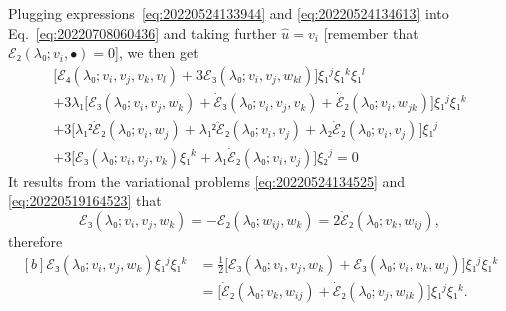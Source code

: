 \documentclass[12pt, final]{scrartcl}
\theoremstyle{definition}
\begin{document}
Plugging expressions~\eqref{eq:20220524133944} and \eqref{eq:20220524134613}
into Eq.~\eqref{eq:20220708060436} and taking further \(\hat{u} = v_i\)
[remember that \(ℰ₂(λ₀; v_i, •) = 0\)], we then get
\begin{multline*}
  \bigl[ℰ₄(λ₀; v_i, v_j, v_k, v_l) + 3ℰ₃(λ₀; v_i, v_j, w_{kl})\bigr] ξ₁^j ξ₁^k ξ₁^l\\
  + 3λ₁ \bigl[ℰ₃(λ₀; v_i, v_j, w_k) + \dot{ℰ}₃(λ₀; v_i, v_j, v_k) + \dot{ℰ}₂(λ₀; v_i, w_{jk}) \bigr] ξ₁^j ξ₁^k\\
  + 3\bigl[λ₁² \dot{ℰ}₂(λ₀; v_i, w_j) + λ₁² \ddot{ℰ}₂(λ₀; v_i, v_j) + λ₂ \dot{ℰ}₂(λ₀; v_i, v_j)\bigr] ξ₁^j\\
  + 3\bigl[ℰ₃(λ₀; v_i, v_j, v_k) ξ₁^k + λ₁ \dot{ℰ}₂(λ₀; v_i, v_j)\bigr] ξ₂^j = 0
\end{multline*}
It results from the variational problems \eqref{eq:20220524134525} and
\eqref{eq:20220519164523} that
\begin{equation*}
  ℰ₃(λ₀; v_i, v_j, w_k) = -ℰ₂(λ₀ ; w_{ij}, w_k) = 2\dot{ℰ}₂(λ₀; v_k, w_{ij}),
\end{equation*}
therefore
\begin{equation*}
  \begin{aligned}[b]
    ℰ₃(λ₀; v_i, v_j, w_k) ξ₁^j ξ₁^k &= \tfrac{1}{2} \bigl[ ℰ₃(λ₀; v_i, v_j, w_k) + ℰ₃(λ₀; v_i, v_k, w_j)\bigr] ξ₁^j ξ₁^k\\
                                    &= \bigl[ \dot{ℰ}₂(λ₀; v_k, w_{ij}) + \dot{ℰ}₂(λ₀; v_j, w_{ik}) \bigr] ξ₁^j ξ₁^k.
  \end{aligned}
\end{equation*}
\end{document}
